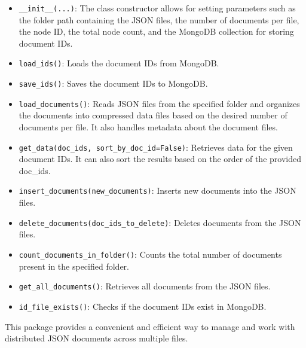 \documentclass{article}
\begin{document}
\begin{itemize}
    \item \texttt{\_\_init\_\_(...)}: The class constructor allows for setting parameters such as the folder path containing the JSON files, the number of documents per file, the node ID, the total node count, and the MongoDB collection for storing document IDs.
    
    \item \texttt{load\_ids()}: Loads the document IDs from MongoDB.
    
    \item \texttt{save\_ids()}: Saves the document IDs to MongoDB.
    
    \item \texttt{load\_documents()}: Reads JSON files from the specified folder and organizes the documents into compressed data files based on the desired number of documents per file. It also handles metadata about the document files.
    
    \item \texttt{get\_data(doc\_ids, sort\_by\_doc\_id=False)}: Retrieves data for the given document IDs. It can also sort the results based on the order of the provided doc\_ids.
    
    \item \texttt{insert\_documents(new\_documents)}: Inserts new documents into the JSON files.
    
    \item \texttt{delete\_documents(doc\_ids\_to\_delete)}: Deletes documents from the JSON files.
    
    \item \texttt{count\_documents\_in\_folder()}: Counts the total number of documents present in the specified folder.
    
    \item \texttt{get\_all\_documents()}: Retrieves all documents from the JSON files.
    
    \item \texttt{id\_file\_exists()}: Checks if the document IDs exist in MongoDB.
\end{itemize}

This package provides a convenient and efficient way to manage and work with distributed JSON documents across multiple files.
\end{document}
